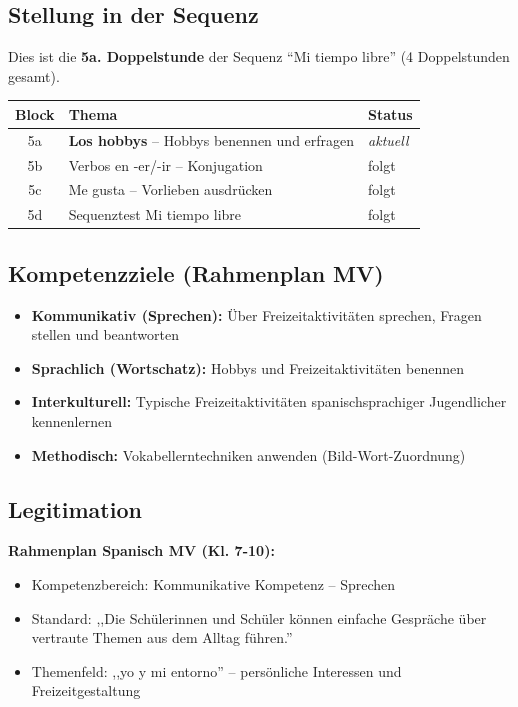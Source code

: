 \documentclass[11pt,a4paper]{article}
\newcommand{\reihenthema}{Mi tiempo libre}
\newcommand{\stundennummer}{5a}
\newcommand{\reihenstunden}{4}
\begin{document}
\subsection{Stellung in der Sequenz}
Dies ist die \textbf{\stundennummer. Doppelstunde} der Sequenz ``\reihenthema'' (\reihenstunden{} Doppelstunden gesamt).

\begin{tabular}{|c|l|l|}
\hline
\textbf{Block} & \textbf{Thema} & \textbf{Status} \\
\hline
5a & \textbf{Los hobbys} -- Hobbys benennen und erfragen & \textit{aktuell} \\
\hline
5b & Verbos en -er/-ir -- Konjugation & folgt \\
\hline
5c & Me gusta -- Vorlieben ausdrücken & folgt \\
\hline
5d & Sequenztest Mi tiempo libre & folgt \\
\hline
\end{tabular}

\subsection{Kompetenzziele (Rahmenplan MV)}

\begin{itemize}
    \item \textbf{Kommunikativ (Sprechen):} Über Freizeitaktivitäten sprechen, Fragen stellen und beantworten
    \item \textbf{Sprachlich (Wortschatz):} Hobbys und Freizeitaktivitäten benennen
    \item \textbf{Interkulturell:} Typische Freizeitaktivitäten spanischsprachiger Jugendlicher kennenlernen
    \item \textbf{Methodisch:} Vokabellerntechniken anwenden (Bild-Wort-Zuordnung)
\end{itemize}

\subsection{Legitimation}
\textbf{Rahmenplan Spanisch MV (Kl. 7-10):}
\begin{itemize}
    \item Kompetenzbereich: Kommunikative Kompetenz -- Sprechen
    \item Standard: ,,Die Schülerinnen und Schüler können einfache Gespräche über vertraute Themen aus dem Alltag führen.''
    \item Themenfeld: ,,yo y mi entorno'' -- persönliche Interessen und Freizeitgestaltung
\end{itemize}
\end{document}

